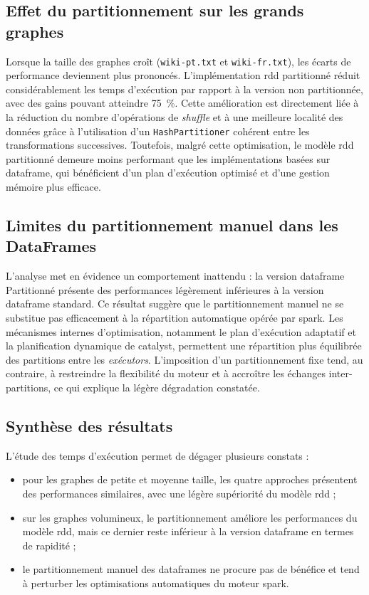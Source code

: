 \documentclass[conference]{IEEEtran}
\begin{document}
\subsection{Effet du partitionnement sur les grands graphes}

Lorsque la taille des graphes croît (\texttt{wiki-pt.txt} et \texttt{wiki-fr.txt}), les écarts de performance deviennent plus prononcés.  
L'implémentation \gls{rdd} partitionné réduit considérablement les temps d'exécution par rapport à la version non partitionnée, avec des gains pouvant atteindre 75~\%.  
Cette amélioration est directement liée à la réduction du nombre d'opérations de \textit{shuffle} et à une meilleure localité des données grâce à l'utilisation d'un \texttt{HashPartitioner} cohérent entre les transformations successives.  
Toutefois, malgré cette optimisation, le modèle \gls{rdd} partitionné demeure moins performant que les implémentations basées sur \gls{dataframe}, qui bénéficient d'un plan d'exécution optimisé et d'une gestion mémoire plus efficace.

\subsection{Limites du partitionnement manuel dans les DataFrames}

L'analyse met en évidence un comportement inattendu : la version \gls{dataframe} Partitionné présente des performances légèrement inférieures à la version \gls{dataframe} standard.  
Ce résultat suggère que le partitionnement manuel ne se substitue pas efficacement à la répartition automatique opérée par \gls{spark}.  
Les mécanismes internes d'optimisation, notamment le plan d'exécution adaptatif et la planification dynamique de \gls{catalyst}, permettent une répartition plus équilibrée des partitions entre les \textit{exécutors}.  
L'imposition d'un partitionnement fixe tend, au contraire, à restreindre la flexibilité du moteur et à accroître les échanges inter-partitions, ce qui explique la légère dégradation constatée.

\subsection{Synthèse des résultats}

L'étude des temps d'exécution permet de dégager plusieurs constats :
\begin{itemize}
    \item pour les graphes de petite et moyenne taille, les quatre approches présentent des performances similaires, avec une légère supériorité du modèle \gls{rdd} ;
    \item sur les graphes volumineux, le partitionnement améliore les performances du modèle \gls{rdd}, mais ce dernier reste inférieur à la version \gls{dataframe} en termes de rapidité ;
    \item le partitionnement manuel des \glspl{dataframe} ne procure pas de bénéfice et tend à perturber les optimisations automatiques du moteur \gls{spark}.
\end{itemize}
\end{document}

